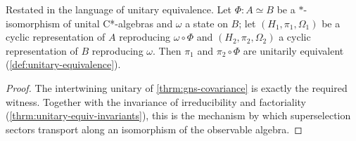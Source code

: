 \begin{theorem}
    \label{thrm:gns-covariance-unitary-equiv}
    \leanok
    Restated in the language of unitary equivalence. Let $\Phi : A \simeq B$ be a $*$-isomorphism of unital C*-algebras and $\omega$ a state on $B$; let $(H_1, \pi_1, \Omega_1)$ be a cyclic representation of $A$ reproducing $\omega \circ \Phi$ and $(H_2, \pi_2, \Omega_2)$ a cyclic representation of $B$ reproducing $\omega$. Then $\pi_1$ and $\pi_2 \circ \Phi$ are unitarily equivalent (\ref{def:unitary-equivalence}).
\end{theorem}
\begin{proof}
    \leanok
    The intertwining unitary of \ref{thrm:gns-covariance} is exactly the required witness. Together with the invariance of irreducibility and factoriality (\ref{thrm:unitary-equiv-invariants}), this is the mechanism by which superselection sectors transport along an isomorphism of the observable algebra.
\end{proof}

